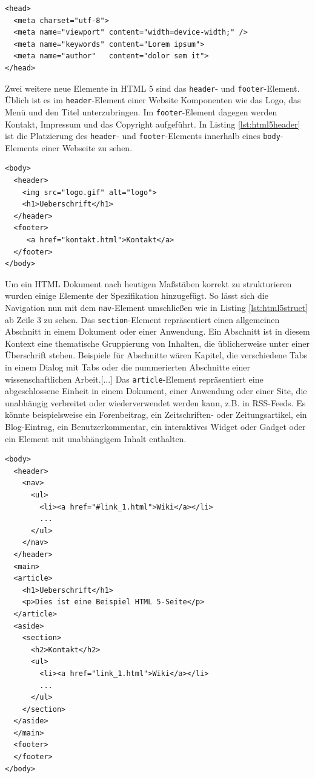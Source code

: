 \vspace{1em}
\begin{lstlisting}[language=HTML5, caption=HTML 5 \texttt{meta}-Element, label=lst:html5meta]
<head>
  <meta charset="utf-8">
  <meta name="viewport" content="width=device-width;" />
  <meta name="keywords" content="Lorem ipsum">
  <meta name="author"   content="dolor sem it">
</head>
\end{lstlisting}
		
Zwei weitere neue Elemente in HTML 5 sind das \texttt{header}- und \texttt{footer}-Element. Üblich ist es im \texttt{header}-Element einer Website Komponenten wie das Logo, das Menü und den Titel unterzubringen. Im \texttt{footer}-Element dagegen werden Kontakt, Impressum und das Copyright aufgeführt. In Listing \ref{lst:html5header} ist die Platzierung des \texttt{header}- und \texttt{footer}-Elements innerhalb eines \texttt{body}-Elements einer Webseite zu sehen.

\vspace{1em}
\begin{lstlisting}[language=HTML5, caption=HTML 5 \texttt{header}- und \texttt{footer}-Element, label=lst:html5header]
<body>
  <header>
    <img src="logo.gif" alt="logo">
    <h1>Ueberschrift</h1>
  </header>
  <footer>
     <a href="kontakt.html">Kontakt</a>
  </footer>
</body>
\end{lstlisting}
	
Um ein HTML Dokument nach heutigen Maßstäben korrekt zu strukturieren wurden einige Elemente der Spezifikation hinzugefügt. So lässt sich die Navigation nun mit dem \texttt{nav}-Element umschließen wie in Listing \ref{lst:html5struct} ab Zeile 3 zu sehen. \glqq Das \texttt{section}-Element repräsentiert einen allgemeinen Abschnitt in einem Dokument oder einer Anwendung. Ein Abschnitt ist in diesem Kontext eine thematische Gruppierung von Inhalten, die üblicherweise unter einer Überschrift stehen. Beispiele für Abschnitte wären Kapitel, die verschiedene Tabs in einem Dialog mit Tabs oder die nummerierten Abschnitte einer wissenschaftlichen Arbeit.[...] Das \texttt{article}-Element repräsentiert eine abgeschlossene Einheit in einem Dokument, einer Anwendung oder einer Site, die unabhängig verbreitet oder wiederverwendet werden kann, z.B. in RSS-Feeds. Es könnte beispielsweise ein Forenbeitrag, ein Zeitschriften- oder Zeitungsartikel, ein Blog-Eintrag, ein Benutzerkommentar, ein interaktives Widget oder Gadget oder ein Element mit unabhängigem Inhalt enthalten.

\vspace{1em}
\begin{lstlisting}[language=HTML5, caption=HTML 5 Struktur Elemente, label=lst:html5struct]
<body>
  <header>
    <nav>
      <ul>
        <li><a href="#link_1.html">Wiki</a></li>
        ...
      </ul>
    </nav>
  </header>
  <main>
  <article>
    <h1>Ueberschrift</h1>
    <p>Dies ist eine Beispiel HTML 5-Seite</p>
  </article>
  <aside>
    <section>
      <h2>Kontakt</h2>
      <ul>
        <li><a href="link_1.html">Wiki</a></li>
        ...
      </ul>
    </section>
  </aside>
  </main>
  <footer>
  </footer>
</body>
\end{lstlisting}
	
